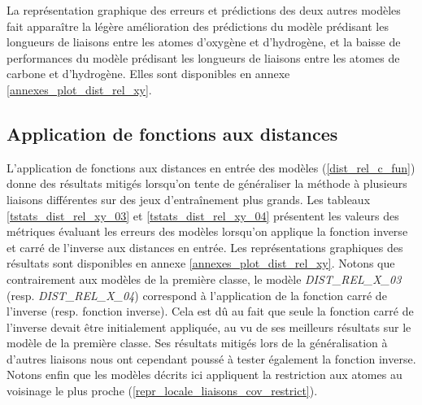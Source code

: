 \par La représentation graphique des erreurs et prédictions des deux autres modèles fait apparaître la légère amélioration des prédictions du modèle prédisant les longueurs de liaisons entre les atomes d'oxygène et d'hydrogène, et la baisse de performances du modèle prédisant les longueurs de liaisons entre les atomes de carbone et d'hydrogène. Elles sont disponibles en annexe \ref{annexes_plot_dist_rel_xy}.
	
\subsection{Application de fonctions aux distances}

\label{dist_rel_xy_fun}


\label{dist_rel_generalisation_fonctions}

\par L'application de fonctions aux distances en entrée des modèles (\ref{dist_rel_c_fun}) donne des résultats mitigés lorsqu'on tente de généraliser la méthode à plusieurs liaisons différentes sur des jeux d'entraînement plus grands. Les tableaux \ref{tstats_dist_rel_xy_03} et \ref{tstats_dist_rel_xy_04} présentent les valeurs des métriques évaluant les erreurs des modèles lorsqu'on applique la fonction inverse et carré de l'inverse aux distances en entrée. Les représentations graphiques des résultats sont disponibles en annexe \ref{annexes_plot_dist_rel_xy}. Notons que contrairement aux modèles de la première classe, le modèle \emph{DIST\_REL\_X\_03} (resp. \emph{DIST\_REL\_X\_04}) correspond à l'application de la fonction carré de l'inverse (resp. fonction inverse). Cela est dû au fait que seule la fonction carré de l'inverse devait être initialement appliquée, au vu de ses meilleurs résultats sur le modèle de la première classe. Ses résultats mitigés lors de la généralisation à d'autres liaisons nous ont cependant poussé à tester également la fonction inverse.\\
Notons enfin que les modèles décrits ici appliquent la restriction aux atomes au voisinage le plus proche (\ref{repr_locale_liaisons_cov_restrict}).\\

